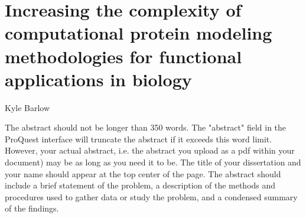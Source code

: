 \chapter*{\centering Increasing the complexity of computational protein modeling methodologies for functional applications in biology}

\begin{center}
  { \large Kyle Barlow }
\end{center}

The abstract should not be longer than 350 words. The "abstract" field in the ProQuest interface will truncate the abstract if it exceeds this word limit. However, your actual abstract, i.e. the abstract you upload as a pdf within your document) may be as long as you need it to be. The title of your dissertation and your name should appear at the top center of the page. The abstract should include a brief statement of the problem, a description of the methods and procedures used to gather data or study the problem, and a condensed summary of the findings.
